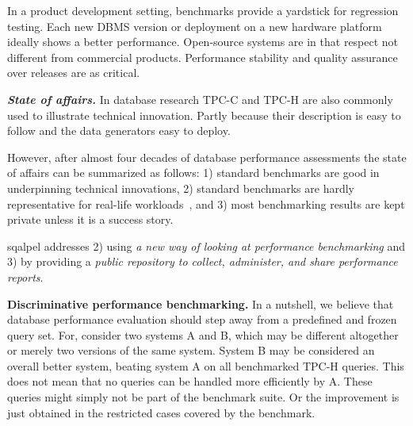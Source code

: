\documentclass{cidr-2019}
\begin{document}
In a product development setting, benchmarks provide a yardstick for
regression testing. Each new DBMS version or deployment on a new
hardware platform ideally shows a better performance.
Open-source systems are in that respect not different from commercial
products. Performance stability and quality assurance over releases
are as critical.

\emph{\bf State of affairs.} 
In database research TPC-C and TPC-H are also commonly used to illustrate
technical innovation. Partly because their description is easy to
follow and the data generators easy to deploy.

However, after almost four decades of database
performance assessments the state of affairs can be summarized as
follows: 1) standard benchmarks are good in underpinning technical
innovations, 2) standard benchmarks are hardly representative for
real-life workloads~\cite{DBLP:conf/sigmod/VogelsgesangHFK18}, and 3)
most benchmarking results are kept private unless it is a success
story.

{\sc sqalpel} addresses 2) using \emph{a new way of looking at
  performance benchmarking} and 3) by providing a \emph{public
  repository to collect, administer, and share performance reports}.


{\bf Discriminative performance benchmarking.}  In a nutshell, we
believe that database performance evaluation should step away from a
predefined and frozen query set. For, consider two systems A and B, which may be
different altogether or merely two versions of the same system. System
B may be considered an overall better system, beating system A on all
benchmarked TPC-H queries. This does not mean that no queries can be
handled more efficiently by A. These queries might simply not be part
of the benchmark suite. Or the improvement is just obtained in the
restricted cases covered by the benchmark.
\end{document}
